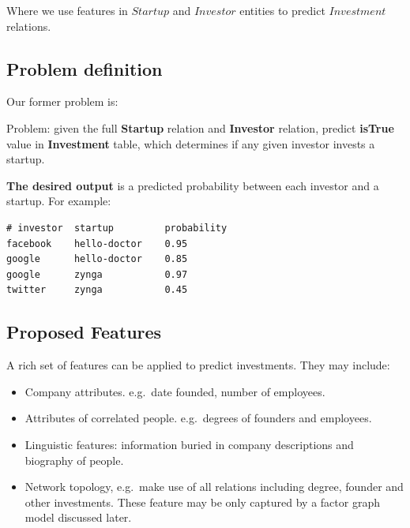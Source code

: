 Where we use features in \(Startup\) and \(Investor\) entities to
predict \(Investment\) relations.

\subsection{Problem definition}\label{problem-definition}

Our former problem is:

\begin{definition}\label{def:problem}

Problem: given the full \textbf{Startup} relation and
\textbf{Investor} relation, predict \textbf{isTrue} value in
\textbf{Investment} table, which determines if any given investor
invests a startup.

\end{definition}

\textbf{The desired output} is a predicted probability between each
investor and a startup. For example:

\small

\begin{verbatim}
# investor  startup         probability
facebook    hello-doctor    0.95
google      hello-doctor    0.85
google      zynga           0.97
twitter     zynga           0.45
\end{verbatim}

\normalsize

\subsection{Proposed Features}\label{proposed-features}

A rich set of features can be applied to predict investments. They may
include:

\begin{itemize}
\itemsep1pt\parskip0pt
\item
  Company attributes. e.g.~date founded, number of employees.
\item
  Attributes of correlated people. e.g.~degrees of founders and
  employees.
\item
  Linguistic features: information buried in company descriptions and
  biography of people.
\item
  Network topology, e.g.~make use of all relations including degree,
  founder and other investments. These feature may be only captured by a
  factor graph model discussed later.
\end{itemize}

